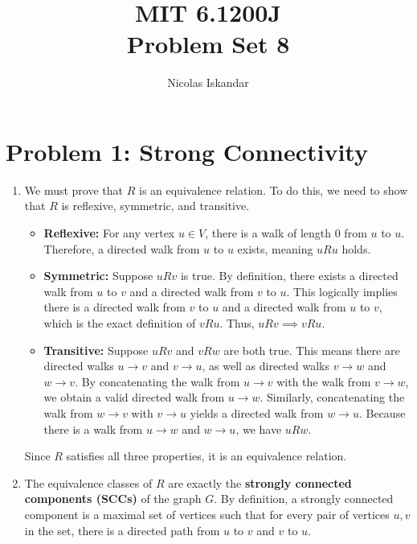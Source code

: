 \documentclass[11pt]{article}
\title{
    \vspace{-2em}
    MIT 6.1200J \\
    Problem Set 8
}
\author{Nicolas Iskandar}
\date{}
\begin{document}
\maketitle

\section*{Problem 1: Strong Connectivity}
\begin{enumerate}[label=\textbf{(\alph*)}]
    \item We must prove that $R$ is an equivalence relation. To do this, we need to show that $R$ is reflexive, symmetric, and transitive.
    
    \begin{itemize}
        \item \textbf{Reflexive:} For any vertex $u \in V$, there is a walk of length $0$ from $u$ to $u$. Therefore, a directed walk from $u$ to $u$ exists, meaning $uRu$ holds. 
        \item \textbf{Symmetric:} Suppose $uRv$ is true. By definition, there exists a directed walk from $u$ to $v$ and a directed walk from $v$ to $u$. This logically implies there is a directed walk from $v$ to $u$ and a directed walk from $u$ to $v$, which is the exact definition of $vRu$. Thus, $uRv \implies vRu$.
        \item \textbf{Transitive:} Suppose $uRv$ and $vRw$ are both true. This means there are directed walks $u \to v$ and $v \to u$, as well as directed walks $v \to w$ and $w \to v$. By concatenating the walk from $u \to v$ with the walk from $v \to w$, we obtain a valid directed walk from $u \to w$. Similarly, concatenating the walk from $w \to v$ with $v \to u$ yields a directed walk from $w \to u$. Because there is a walk from $u \to w$ and $w \to u$, we have $uRw$.
    \end{itemize}
    Since $R$ satisfies all three properties, it is an equivalence relation.

    \item The equivalence classes of $R$ are exactly the \textbf{strongly connected components (SCCs)} of the graph $G$. By definition, a strongly connected component is a maximal set of vertices such that for every pair of vertices $u, v$ in the set, there is a directed path from $u$ to $v$ and $v$ to $u$.
\end{enumerate}

\vspace{0.5cm}
\end{document}
